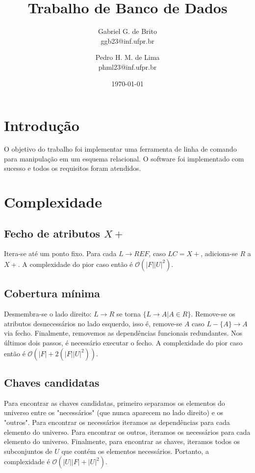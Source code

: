 \documentclass{article}
\title{Trabalho de Banco de Dados}
\author{Gabriel G. de Brito \\ ggb23@inf.ufpr.br \and Pedro H. M. de Lima \\ phml23@inf.ufpr.br}
\date{\today}
\begin{document}
\maketitle

\section{Introdução}

O objetivo do trabalho foi implementar uma ferramenta de linha de comando para manipulação em um esquema relacional. O software foi implementado com sucesso e todos os requisitos foram atendidos.

\section{Complexidade}

\subsection{Fecho de atributos $ X+ $}

Itera-se até um ponto fixo. Para cada $ L \rightarrow REF $, caso $ LC = X+ $, adiciona-se $ R $ a $ X+ $. A complexidade do pior caso então é $ \mathcal{O}(|F| |U|^2) $.

\subsection{Cobertura mínima}

Desmembra-se o lado direito: $ L \rightarrow R $ se torna $ \{ L \rightarrow A | A \in R \} $. Remove-se os atributos desnecessários no lado esquerdo, isso é, remove-se $ A $ caso $ L - \{A\} \rightarrow A $ via fecho. Finalmente, removemos as dependências funcionais redundantes. Nos últimos dois passos, é necessário executar o fecho. A complexidade do pior caso então é $ \mathcal{O}(|F| + 2 (|F| |U|^2)) $.

\subsection{Chaves candidatas}

Para encontrar as chaves candidatas, primeiro separamos os elementos do universo entre os "necessários" (que nunca aparecem no lado direito) e os "outros". Para encontrar os necessários iteramos as dependências para cada elemento do universo. Para encontrar os outros, iteramos os necessários para cada elemento do universo. Finalmente, para encontrar as chaves, iteramos todos os subconjuntos de $ U $ que contém os elementos necessários. Portanto, a complexidade é $ \mathcal{O}(|U| |F| + |U|^2) $.
\end{document}
